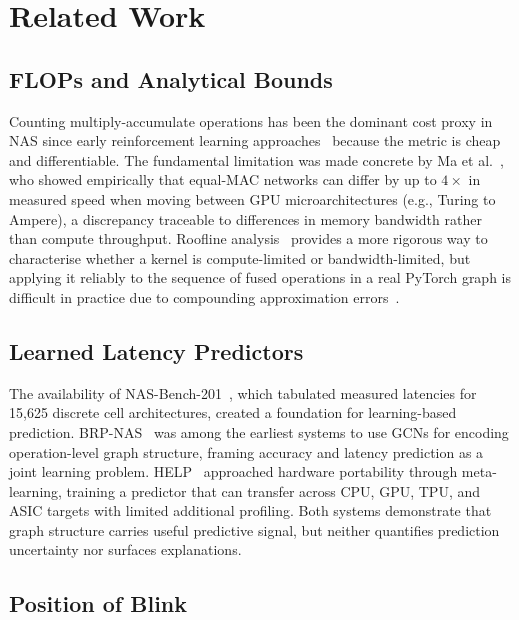 \documentclass[conference]{IEEEtran}
\begin{document}
\section{Related Work}

\subsection{FLOPs and Analytical Bounds}

Counting multiply-accumulate operations has been the dominant cost proxy in NAS
since early reinforcement learning approaches~\cite{zoph2016neural} because the
metric is cheap and differentiable. The fundamental limitation was made concrete
by Ma et al.~\cite{ma2018shufflenet}, who showed empirically that equal-MAC
networks can differ by up to $4\times$ in measured speed when moving between GPU
microarchitectures (e.g., Turing to Ampere), a discrepancy traceable to
differences in memory bandwidth rather than compute throughput. Roofline
analysis~\cite{williams2009roofline} provides a more rigorous way to characterise
whether a kernel is compute-limited or bandwidth-limited, but applying it reliably
to the sequence of fused operations in a real PyTorch graph is difficult in
practice due to compounding approximation errors~\cite{dong2021ppp}.

\subsection{Learned Latency Predictors}

The availability of NAS-Bench-201~\cite{dong2020nas}, which tabulated measured
latencies for 15,625 discrete cell architectures, created a foundation for
learning-based prediction. BRP-NAS~\cite{dudziak2020brp} was among the earliest
systems to use GCNs for encoding operation-level graph structure, framing accuracy
and latency prediction as a joint learning problem. HELP~\cite{lee2021hardware}
approached hardware portability through meta-learning, training a predictor that
can transfer across CPU, GPU, TPU, and ASIC targets with limited additional
profiling. Both systems demonstrate that graph structure carries useful predictive
signal, but neither quantifies prediction uncertainty nor surfaces explanations.

\subsection{Position of Blink}
\end{document}
